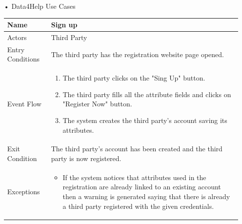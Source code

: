\begin{enumerate}

\FloatBarrier
\item[•]{\Large Data4Help Use Cases}

\begin{table}[h]
\begin{tabular}{|l|p{}|}
\hline
Name             & Sign up \\ \hline
Actors           & Third Party  \\ \hline
Entry Conditions & The third party has the registration website page opened.    \\ \hline
Event Flow       & \begin{enumerate}
            \item The third party clicks on the "Sing Up" button.
            \item The third party fills all the attribute fields and clicks on "Register Now" button.
            \item The system creates the third party's account saving its attributes.
        \end{enumerate}\\ \hline
Exit Condition   & The third party's account has been created and the third party is now registered.\\ \hline
Exceptions       & \begin{itemize}
\item If the system notices that attributes used in the registration are already linked to an existing account then a warning is generated saying that there is already a third party registered with the given credentials.
\end{itemize}\\ \hline
\end{tabular}
\end{table}
\FloatBarrier


\end{enumerate}
